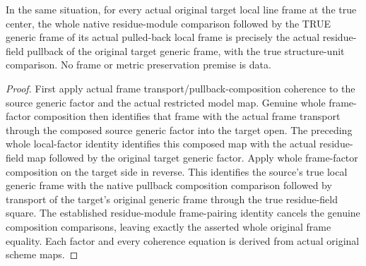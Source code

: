 \begin{theorem}
\label{berkovich:actual-generic-local-frame-residue-pullback}
\leanok
{}
In the same situation, for every actual original target local line frame at
the true center, the whole native residue-module comparison followed by the
TRUE generic frame of its actual pulled-back local frame is precisely the
actual residue-field pullback of the original target generic frame, with the
true structure-unit comparison. No frame or metric preservation premise is data.
\end{theorem}
\begin{proof}
First apply actual frame transport/pullback-composition coherence to the
source generic factor and the actual restricted model map. Genuine whole
frame-factor composition then identifies that frame with the actual frame
transport through the composed source generic factor into the target open.
The preceding whole local-factor identity identifies this composed map with
the actual residue-field map followed by the original target generic factor.
Apply whole frame-factor composition on the target side in reverse. This
identifies the source's true local generic frame with the native pullback
composition comparison followed by transport of the target's original generic
frame through the true residue-field square. The established residue-module
frame-pairing identity cancels the genuine composition comparisons, leaving
exactly the asserted whole original frame equality. Each factor and every
coherence equation is derived from actual original scheme maps.
\end{proof}
